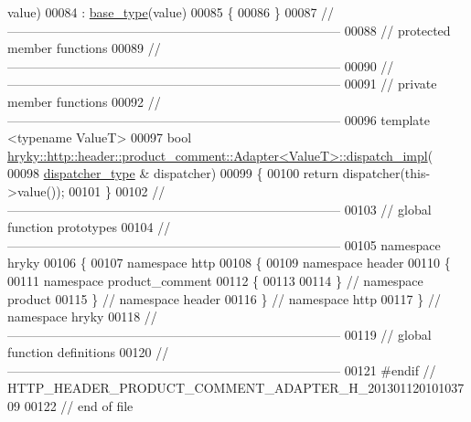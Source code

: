 \begin{DoxyCode}
      value)
00084     : \hyperlink{classhryky_1_1_adapter}{base_type}(value)
00085 \{
00086 \}
00087 \textcolor{comment}{//
      ------------------------------------------------------------------------------}
00088 \textcolor{comment}{// protected member functions}
00089 \textcolor{comment}{//
      ------------------------------------------------------------------------------}
00090 \textcolor{comment}{//
      ------------------------------------------------------------------------------}
00091 \textcolor{comment}{// private member functions}
00092 \textcolor{comment}{//
      ------------------------------------------------------------------------------}
00096 \textcolor{comment}{}\textcolor{keyword}{template} <\textcolor{keyword}{typename} ValueT>
00097 \textcolor{keywordtype}{bool} \hyperlink{classhryky_1_1http_1_1header_1_1product__comment_1_1_adapter}{hryky::http::header::product_comment::Adapter<ValueT>::dispatch_impl}(
00098     \hyperlink{classhryky_1_1http_1_1header_1_1product__comment_1_1dispatcher_1_1_base}{dispatcher_type} & dispatcher)
00099 \{
00100     \textcolor{keywordflow}{return} dispatcher(this->value());
00101 \}
00102 \textcolor{comment}{//
      ------------------------------------------------------------------------------}
00103 \textcolor{comment}{// global function prototypes}
00104 \textcolor{comment}{//
      ------------------------------------------------------------------------------}
00105 \textcolor{keyword}{namespace }hryky
00106 \{
00107 \textcolor{keyword}{namespace }http
00108 \{
00109 \textcolor{keyword}{namespace }header
00110 \{
00111 \textcolor{keyword}{namespace }product\_comment
00112 \{
00113 
00114 \} \textcolor{comment}{// namespace product}
00115 \} \textcolor{comment}{// namespace header}
00116 \} \textcolor{comment}{// namespace http}
00117 \} \textcolor{comment}{// namespace hryky}
00118 \textcolor{comment}{//
      ------------------------------------------------------------------------------}
00119 \textcolor{comment}{// global function definitions}
00120 \textcolor{comment}{//
      ------------------------------------------------------------------------------}
00121 \textcolor{preprocessor}{#endif // HTTP\_HEADER\_PRODUCT\_COMMENT\_ADAPTER\_H\_20130112010103709}
00122 \textcolor{preprocessor}{}\textcolor{comment}{// end of file}
\end{DoxyCode}
